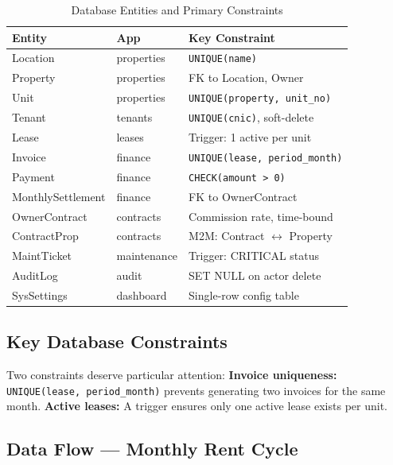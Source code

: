 \documentclass[conference]{IEEEtran}
\begin{document}
\begin{table}[h]
\centering
\caption{Database Entities and Primary Constraints}
\label{tab:entities}
\renewcommand{\arraystretch}{1.3}
\setlength{\tabcolsep}{2pt}
\scriptsize
\begin{tabularx}{\columnwidth}{|l|l|X|}
\hline
\textbf{Entity} & \textbf{App} & \textbf{Key Constraint} \\
\hline
Location & properties & \texttt{UNIQUE(name)} \\
\hline
Property & properties & FK to Location, Owner \\
\hline
Unit & properties & \texttt{UNIQUE(property, unit\_no)} \\
\hline
Tenant & tenants & \texttt{UNIQUE(cnic)}, soft-delete \\
\hline
Lease & leases & Trigger: 1 active per unit \\
\hline
Invoice & finance & \texttt{UNIQUE(lease, period\_month)} \\
\hline
Payment & finance & \texttt{CHECK(amount > 0)} \\
\hline
MonthlySettlement & finance & FK to OwnerContract \\
\hline
OwnerContract & contracts & Commission rate, time-bound \\
\hline
ContractProp & contracts & M2M: Contract $\leftrightarrow$ Property \\
\hline
MaintTicket & maintenance & Trigger: CRITICAL status \\
\hline
AuditLog & audit & SET NULL on actor delete \\
\hline
SysSettings & dashboard & Single-row config table \\
\hline
\end{tabularx}
\end{table}

\subsection{Key Database Constraints}

Two constraints deserve particular attention:
\textbf{Invoice uniqueness:} \texttt{UNIQUE(lease, period\_month)} prevents generating two invoices for the same month.
\textbf{Active leases:} A trigger ensures only one active lease exists per unit.

\subsection{Data Flow — Monthly Rent Cycle}
\end{document}
